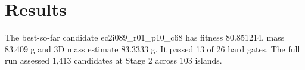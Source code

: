 \section{Results}The best-so-far candidate ec2i089\_r01\_p10\_c68 has fitness 80.851214, mass 83.409 g and 3D mass estimate 83.3333 g. It passed 13 of 26 hard gates. The full run assessed 1,413 candidates at Stage 2 across 103 islands.
